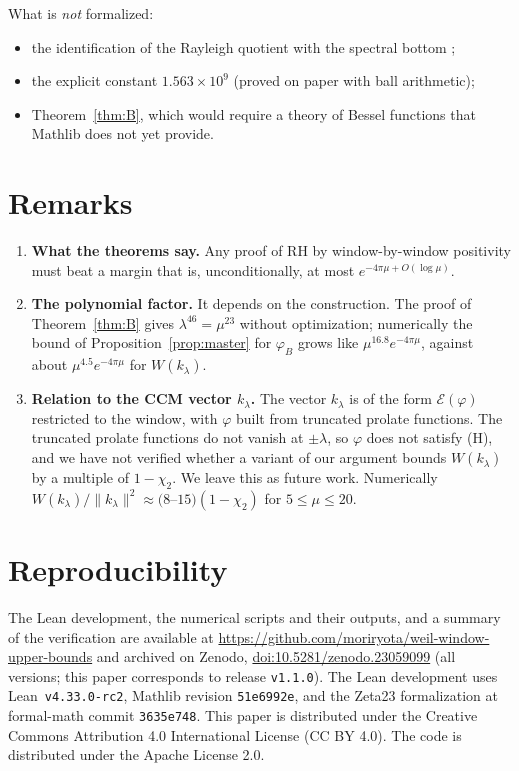 \documentclass[11pt]{amsart}
\newcommand{\doi}[1]{\href{https://doi.org/#1}{doi:#1}}
\theoremstyle{definition}
\theoremstyle{remark}
\numberwithin{equation}{section}
\newcommand{\E}{\mathcal{E}}
\begin{document}
What is \emph{not} formalized:
\begin{itemize}
\item the identification of the Rayleigh quotient with the spectral bottom \cite[Thm.~3.6]{CCM25};
\item the explicit constant $1.563\times10^9$ (proved on paper with ball arithmetic);
\item Theorem~\ref{thm:B}, which would require a theory of Bessel functions that Mathlib does not yet provide.
\end{itemize}

\section{Remarks}
\begin{enumerate}
\item \textbf{What the theorems say.} Any proof of RH by window-by-window positivity must beat a margin that is, unconditionally, at most $e^{-4\pi\mu+O(\log\mu)}$.
\item\label{rem:poly} \textbf{The polynomial factor.} It depends on the construction. The proof of Theorem~\ref{thm:B} gives $\lambda^{46}=\mu^{23}$ without optimization; numerically the bound of Proposition~\ref{prop:master} for $\varphi_B$ grows like $\mu^{16.8}e^{-4\pi\mu}$, against about $\mu^{4.5}e^{-4\pi\mu}$ for $W(k_\lambda)$.
\item \textbf{Relation to the CCM vector $k_\lambda$.} The vector $k_\lambda$ is of the form $\E(\varphi)$ restricted to the window, with $\varphi$ built from truncated prolate functions. The truncated prolate functions do not vanish at $\pm\lambda$, so $\varphi$ does not satisfy (H), and we have not verified whether a variant of our argument bounds $W(k_\lambda)$ by a multiple of $1-\chi_2$. We leave this as future work. Numerically $W(k_\lambda)/\|k_\lambda\|^2\approx(8$--$15)(1-\chi_2)$ for $5\le\mu\le20$.
\end{enumerate}

\section*{Reproducibility}
The Lean development, the numerical scripts and their outputs, and a summary of the verification are available at \url{https://github.com/moriryota/weil-window-upper-bounds} and archived on Zenodo, \doi{10.5281/zenodo.23059099} (all versions; this paper corresponds to release \texttt{v1.1.0}). The Lean development uses Lean~\texttt{v4.33.0-rc2}, Mathlib revision \texttt{51e6992e}, and the Zeta23 formalization at formal-math commit \texttt{3635e748}. This paper is distributed under the Creative Commons Attribution 4.0 International License (CC BY 4.0). The code is distributed under the Apache License 2.0.
\end{document}

